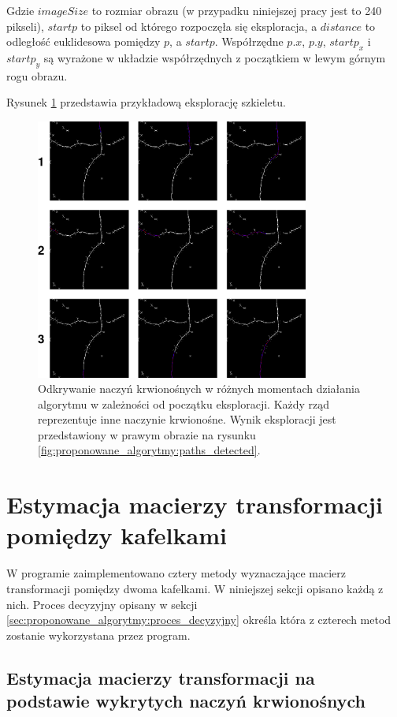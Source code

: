 Gdzie $imageSize$ to rozmiar obrazu (w przypadku niniejszej pracy jest to 240 pikseli), $startp$ to piksel od którego rozpoczęła się eksploracja, a $distance$ to odległość euklidesowa pomiędzy $p$, a $startp$. Współrzędne $p.x$, $p.y$, $startp_{x}$ i $startp_{y}$ są wyrażone w układzie współrzędnych z początkiem w lewym górnym rogu obrazu.

Rysunek \ref{fig:proponowane_algorytmy:path_explor} przedstawia przykładową eksplorację szkieletu.

\begin{figure}[htb]
  \centering
  \includegraphics[width=9cm]{gfx/path_explor}
  \caption{Odkrywanie naczyń krwionośnych w różnych momentach działania algorytmu w zależności od początku eksploracji. Każdy rząd reprezentuje inne naczynie krwionośne. Wynik eksploracji jest przedstawiony w prawym obrazie na rysunku \ref{fig:proponowane_algorytmy:paths_detected}.}
  \label{fig:proponowane_algorytmy:path_explor}
\end{figure}

\section{Estymacja macierzy transformacji pomiędzy kafelkami}
\label{sec:proponowane_algorytmy:estymacja}

W programie zaimplementowano cztery metody wyznaczające macierz transformacji pomiędzy dwoma kafelkami. W niniejszej sekcji opisano każdą z nich. Proces decyzyjny opisany w sekcji \ref{sec:proponowane_algorytmy:proces_decyzyjny} określa która z czterech metod zostanie wykorzystana przez program.

\subsection{Estymacja macierzy transformacji na podstawie wykrytych naczyń krwionośnych}
\label{sec:proponowane_algorytmy:use_paths}

